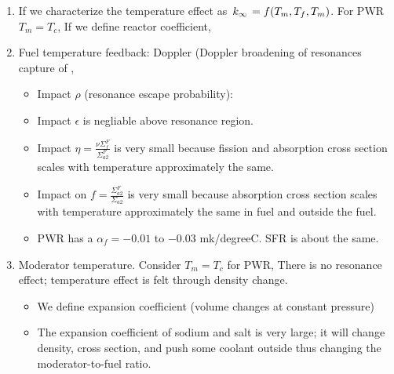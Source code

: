 \documentclass{school-22.211-notes}
\begin{document}
\begin{enumerate}
\begin{enumerate}
    \item If we characterize the temperature effect as $\left. k_{\infty} \right. = f(T_m, T_f, T_m)$. For PWR $T_m = T_c$, 
      If we define reactor coefficient, 


    \item Fuel temperature feedback: Doppler (Doppler broadening of resonances capture of , 
      \begin{itemize}
      \item Impact $\rho$ (resonance escape probability): 
    \item Impact $\epsilon$ is negliable above resonance region. 
    \item Impact $\eta = \frac{\nu \Sigma_f^F}{\Sigma_{a2}^F}$ is very small because fission and absorption cross section scales with temperature approximately the same. 
    \item Impact on $f= \frac{\Sigma_{a2}^F}{\Sigma_{a2}}$ is very small because absorption cross section scales with temperature approximately the same in fuel and outside the fuel.
    \item PWR has a $\alpha_f = -0.01$ to $-0.03$ mk/degreeC. SFR is about the same. 
      \end{itemize}
      
    \item Moderator temperature. Consider $T_m = T_c$ for PWR, 
      There is no resonance effect; temperature effect is felt through density change. 
      \begin{itemize}
      \item We define expansion coefficient (volume changes at constant pressure) 

      \item The expansion coefficient of sodium and salt is very large; it will change density, cross section, and push some coolant outside thus changing the moderator-to-fuel ratio. 


\end{itemize}
\end{enumerate}
\end{enumerate}
\end{document}
